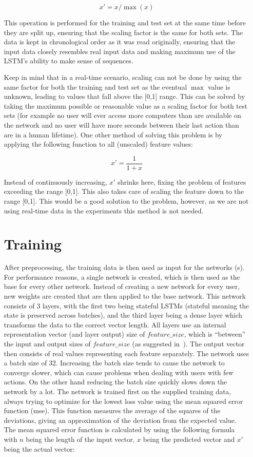 $$ x' = x / \max (x) $$

This operation is performed for the training and test set at the same time before they are split up, ensuring that the scaling factor is the same for both sets. The data is kept in chronological order as it was read originally, ensuring that the input data closely resembles real input data and making maximum use of the LSTM's ability to make sense of sequences.

Keep in mind that in a real-time scenario, scaling can not be done by using the same factor for both the training and test set as the eventual \(\max \) value is unknown, leading to values that fall above the [0,1] range. This can be solved by taking the maximum possible or reasonable value as a scaling factor for both test sets (for example no user will ever access more computers than are available on the network and no user will have more seconds between their last action than are in a human lifetime). One other method of solving this problem is by applying the following function to all (unscaled) feature values:

$$ x' = \dfrac{1}{1+x} $$

Instead of continuously increasing, \(x'\) shrinks here, fixing the problem of features exceeding the range [0,1]. This also takes care of scaling the feature down to the range [0,1]. This would be a good solution to the problem, however, as we are not using real-time data in the experiments this method is not needed.

\section{Training}
After preprocessing, the training data is then used as input for the networks (s). For performance reasons, a single network is created, which is then used as the base for every other network. Instead of creating a new network for every user, new weights are created that are then applied to the base network. This network consists of 3 layers, with the first two being stateful LSTMs (stateful meaning the state is preserved across batches), and the third layer being a dense layer which transforms the data to the correct vector length. All layers use an internal representation vector (and layer output) size of \(feature\_size \), which is \enquote{between} the input and output sizes of \(feature\_size \) (as suggested in~\cite{heaton2008introduction}). The output vector then consists of real values representing each feature separately. The network uses a batch size of 32. Increasing the batch size tends to cause the network to converge slower, which can cause problems when dealing with users with few actions. On the other hand reducing the batch size quickly slows down the network by a lot. The network is trained first on the supplied training data, always trying to optimize for the lowest loss value using the mean squared error function (mse). This function measures the average of the squares of the deviations, giving an approximation of the deviation from the expected value. The mean squared error function is calculated by using the following formula with \(n\) being the length of the input vector, \(x\) being the predicted vector and \(x'\) being the actual vector:

